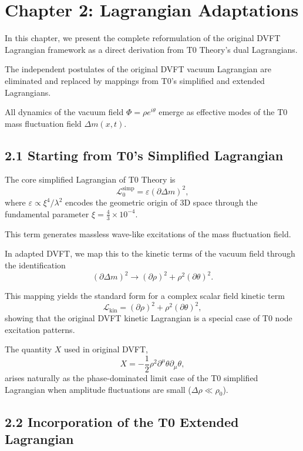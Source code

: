 \documentclass[12pt,a4paper]{article}
\begin{document}
	\section{Chapter 2: Lagrangian Adaptations}
	
	In this chapter, we present the complete reformulation of the original DVFT Lagrangian framework as a direct derivation from T0 Theory's dual Lagrangians.
	
	The independent postulates of the original DVFT vacuum Lagrangian are eliminated and replaced by mappings from T0's simplified and extended Lagrangians.
	
	All dynamics of the vacuum field $\Phi = \rho e^{i\theta}$ emerge as effective modes of the T0 mass fluctuation field $\Delta m(x,t)$.
	
	\subsection{2.1 Starting from T0's Simplified Lagrangian}
	
	The core simplified Lagrangian of T0 Theory is
	\[
	\mathcal{L}_0^{\text{simp}} = \varepsilon (\partial \Delta m)^2,
	\]
	where $\varepsilon \propto \xi^4 / \lambda^2$ encodes the geometric origin of 3D space through the fundamental parameter $\xi = \frac{4}{3} \times 10^{-4}$.
	
	This term generates massless wave-like excitations of the mass fluctuation field.
	
	In adapted DVFT, we map this to the kinetic terms of the vacuum field through the identification
	\[
	(\partial \Delta m)^2 \to (\partial \rho)^2 + \rho^2 (\partial \theta)^2.
	\]
	
	This mapping yields the standard form for a complex scalar field kinetic term
	\[
	\mathcal{L}_{\text{kin}} = (\partial \rho)^2 + \rho^2 (\partial \theta)^2,
	\]
	showing that the original DVFT kinetic Lagrangian is a special case of T0 node excitation patterns.
	
	The quantity $X$ used in original DVFT,
	\[
	X = -\frac{1}{2} \rho^2 \partial^\mu \theta \partial_\mu \theta,
	\]
	arises naturally as the phase-dominated limit case of the T0 simplified Lagrangian when amplitude fluctuations are small ($\Delta \rho \ll \rho_0$).
	
	\subsection{2.2 Incorporation of the T0 Extended Lagrangian}
	
\end{document}
